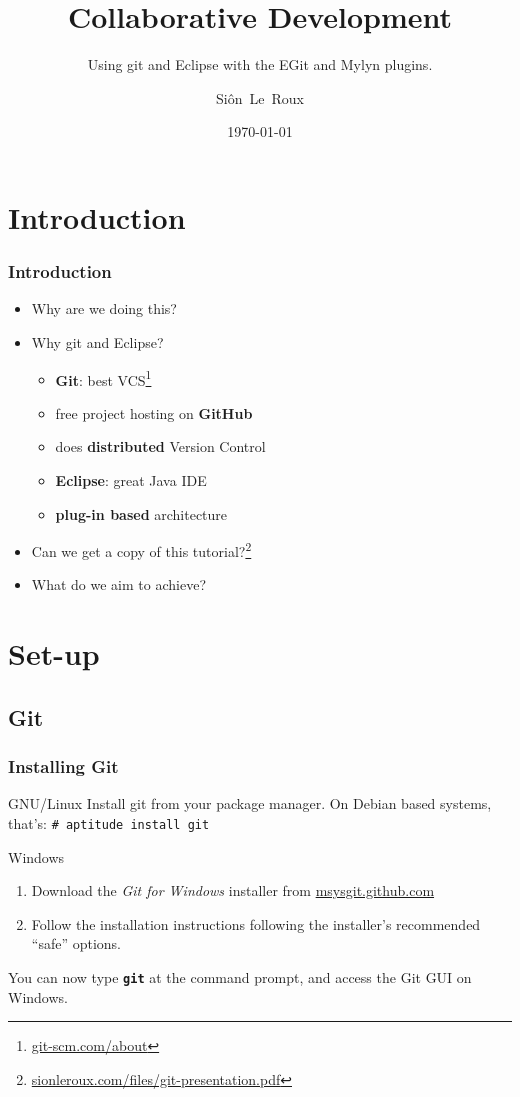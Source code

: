 \documentclass{beamer}
\title[Git \& Eclipse]{Collaborative Development}
\subtitle{Using git and Eclipse with the EGit and Mylyn plugins.}
\author{Si\^on~Le~Roux}
\date{\today}
\begin{document}
\begin{frame}
  \titlepage
\end{frame}

\section{Introduction}
\begin{frame}[<+->]
  \frametitle{Introduction}
  \begin{itemize}
	\item Why are we doing this?
	\item Why git and Eclipse?
	  \begin{itemize}
		\item \textbf{Git}: best VCS\footnote{\href{http://git-scm.com/about}{git-scm.com/about}}
		\item free project hosting on \textbf{GitHub}
		\item does \textbf{distributed} Version Control
		\item \textbf{Eclipse}: great Java IDE
		\item \textbf{plug-in based} architecture
	  \end{itemize}
	\item Can we get a copy of this tutorial?\footnote{\href{http://sionleroux.com/files/git-presentation.pdf}{sionleroux.com/files/git-presentation.pdf}}
	\item What do we aim to achieve?
  \end{itemize}
\end{frame}

\section{Set-up}
\subsection{Git}
\begin{frame}[<+->]
  \frametitle{Installing Git}
  \begin{block}{GNU/Linux}
	Install git from your package manager. On Debian based systems, that's: \texttt{\# aptitude install git}
  \end{block}
  \begin{block}{Windows}
	\begin{enumerate}
	  \item Download the \emph{Git for Windows} installer from \href{http://msysgit.github.com}{msysgit.github.com}
	  \item Follow the installation instructions following the installer's recommended ``safe'' options.
	\end{enumerate}
  \end{block}\pause
  You can now type \textbf{\texttt{git}} at the command prompt, and access the Git GUI on Windows.
\end{frame}
\end{document}
